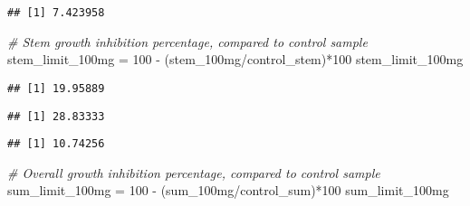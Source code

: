 \documentclass[
]{article}
\newenvironment{Shaded}{\begin{snugshade}}{\end{snugshade}}
\newcommand{\CommentTok}[1]{\textcolor[rgb]{0.56,0.35,0.01}{\textit{#1}}}
\newcommand{\DecValTok}[1]{\textcolor[rgb]{0.00,0.00,0.81}{#1}}
\newcommand{\FunctionTok}[1]{\textcolor[rgb]{0.00,0.00,0.00}{#1}}
\newcommand{\NormalTok}[1]{#1}
\newcommand{\OtherTok}[1]{\textcolor[rgb]{0.56,0.35,0.01}{#1}}
\newcommand{\SpecialCharTok}[1]{\textcolor[rgb]{0.00,0.00,0.00}{#1}}
\begin{document}
\begin{verbatim}
## [1] 7.423958
\end{verbatim}

\begin{Shaded}
\begin{Highlighting}[]
\CommentTok{\# Stem growth inhibition percentage, compared to control sample}
\NormalTok{stem\_limit\_100mg }\OtherTok{=} \DecValTok{100} \SpecialCharTok{{-}}\NormalTok{ (stem\_100mg}\SpecialCharTok{/}\NormalTok{control\_stem)}\SpecialCharTok{*}\DecValTok{100}
\NormalTok{stem\_limit\_100mg}
\end{Highlighting}
\end{Shaded}

\begin{verbatim}
## [1] 19.95889
\end{verbatim}

\begin{Shaded}
\end{Shaded}

\begin{verbatim}
## [1] 28.83333
\end{verbatim}

\begin{Shaded}
\end{Shaded}

\begin{verbatim}
## [1] 10.74256
\end{verbatim}

\begin{Shaded}
\begin{Highlighting}[]
\CommentTok{\# Overall growth inhibition percentage, compared to control sample}
\NormalTok{sum\_limit\_100mg }\OtherTok{=} \DecValTok{100} \SpecialCharTok{{-}}\NormalTok{ (sum\_100mg}\SpecialCharTok{/}\NormalTok{control\_sum)}\SpecialCharTok{*}\DecValTok{100}
\NormalTok{sum\_limit\_100mg}
\end{Highlighting}
\end{Shaded}
\end{document}
